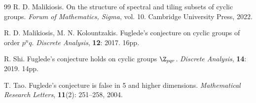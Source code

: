 \begin{thebibliography}{99}
R. D. Malikiosis. 
On the structure of spectral and tiling subsets of cyclic groups. 
\newblock
{\em Forum of Mathematics, Sigma}, vol. 10. Cambridge University Press, 2022. 	

R. D. Malikiosis, M. N. Kolountzakis. 
\newblock
Fuglede's conjecture on cyclic groups of order $p^nq$. 
\newblock
{\em Discrete Analysis}, {\bf 12}: 2017. 16pp.

R. Shi.
\newblock
Fuglede's conjecture holds on cyclic groups $\Z_{pqr}$. 
\newblock 
{\em Discrete Analysis}, \textbf{14}: 2019. 14pp.
        
T. Tao. 
\newblock 
 Fuglede's conjecture is false in 5 and higher dimensions. 
 \newblock
 {\em Mathematical Research Letters}, {\bf 11}(2): 251--258, 2004.
        
 \end{thebibliography}
